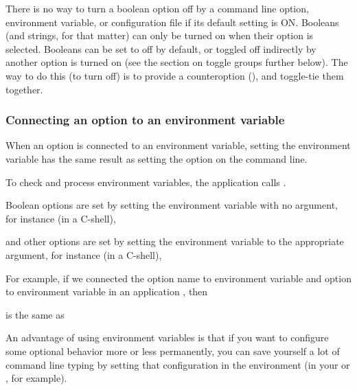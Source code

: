 There is no way to turn a boolean option off by a command line option,
environment variable, or configuration file if its default setting is
ON. Booleans (and strings, for that matter) can only be turned on when
their option is selected. Booleans can be set to off by default, or
toggled off indirectly by another option is turned on (see the section
on toggle groups further below). The way to do this (to turn
 off) is to provide a counteroption (), and
toggle-tie them together.

   \subsubsection{Connecting an option to an environment variable}

When an option is connected to an environment variable, setting the
environment variable has the same result as setting the option on the
command line.

To check and process environment variables, the application calls
.

Boolean options are set by setting the environment variable with no
argument, for instance (in a C-shell),

\begin{cchunk}
\end{cchunk}

and other options are set by setting the environment variable to the
appropriate argument, for instance (in a C-shell),

\begin{cchunk}
\end{cchunk}

For example, if we connected the option name  to
environment variable  and option
 to environment variable 
in an application , then

\begin{cchunk}
\end{cchunk}

is the same as 

\begin{cchunk}
\end{cchunk}

An advantage of using environment variables is that if you want to
configure some optional behavior more or less permanently, you can
save yourself a lot of command line typing by setting that
configuration in the environment (in your  or
, for example).


